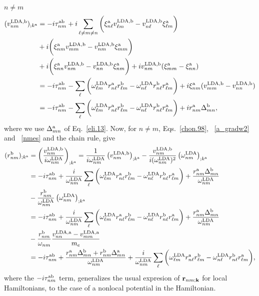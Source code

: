  $n\ne m$
\begin{align}\label{nmes}
(v^{\mathrm{LDA},\mathrm{b}}_{nm})_{;k^{\mathrm{a}}}&=
-i\tau^{\mathrm{a}\mathrm{b}}_{nm}
+i  
\sum_{\ell\ne m\ne n}
\bigg(
\xi^{\mathrm{a}}_{n\ell}  
v^{\mathrm{LDA},\mathrm{b}}_{\ell m}
-  
v^{\mathrm{LDA},\mathrm{b}}_{n\ell}
\xi^{\mathrm{a}}_{\ell m}
\bigg)  
\nonumber\\
&+  
i  
\bigg(
\xi^{\mathrm{a}}_{nm}  
v^{\mathrm{LDA},\mathrm{b}}_{mm}
-  
v^{\mathrm{LDA},\mathrm{b}}_{nm}
\xi^{\mathrm{a}}_{mm}
\bigg)  
\nonumber\\
&+  
i  
\bigg(
\xi^{\mathrm{a}}_{nn}  
v^{\mathrm{LDA},\mathrm{b}}_{nm}
-  
v^{\mathrm{LDA},\mathrm{b}}_{nn}
\xi^{\mathrm{a}}_{nm}
\bigg)  
+i   
v^{\mathrm{LDA},\mathrm{b}}_{nm}(\xi^{\mathrm{a}}_{mm}
-
\xi^{\mathrm{a}}_{nn}
)  
\nonumber \\
&=
-i\tau^{\mathrm{a}\mathrm{b}}_{nm}
-
\sum_{\ell}
\bigg(
\omega^{\mathrm{LDA}}_{\ell m}  
r^{\mathrm{a}}_{n\ell}  
r^{\mathrm{b}}_{\ell m}
-
\omega^{\mathrm{LDA}}_{n\ell}  
r^{\mathrm{b}}_{n\ell}  
r^{\mathrm{a}}_{\ell m}
\bigg)  
+i  
\xi^{\mathrm{a}}_{nm}
(v^{\mathrm{LDA},\mathrm{b}}_{mm}
-  
v^{\mathrm{LDA},\mathrm{b}}_{nn}
)  
\nonumber \\
&=
-i\tau^{\mathrm{a}\mathrm{b}}_{nm}
-
\sum_{\ell}
\bigg(
\omega^{\mathrm{LDA}}_{\ell m}   
r^{\mathrm{a}}_{n\ell}   
r^{\mathrm{b}}_{\ell m}
-
\omega^{\mathrm{LDA}}_{n\ell}   
r^{\mathrm{b}}_{n\ell}   
r^{\mathrm{a}}_{\ell m}
\bigg)  
+i   
r^{\mathrm{a}}_{nm}
\Delta^{\mathrm{b}}_{mn}
,
\end{align}   
where we use $\Delta^{\mathrm{a}}_{mn}$ of Eq.~\eqref{eli.13}.
Now, for $n \ne m$, Eqs.~\eqref{chon.98},
~\eqref{a_gradw2} and 
~\eqref{nmes} and the chain rule, give
\begin{align}\label{na_rgendevn}
(r^{\mathrm{b}}_{nm})_{;k^{\mathrm{a}}}
&=\left(\frac{v^{\mathrm{LDA},\mathrm{b}}_{nm}}{i\omega^{\mathrm{LDA}}_{nm}}\right)_{;k^{\mathrm{a}}}
=
\frac{1}
{i\omega^{\mathrm{LDA}}_{nm}}
\left( 
v^{\mathrm{LDA},\mathrm{b}}_{nm}
\right)_{;k^{\mathrm{a}}}
-
\frac{v^{\mathrm{LDA},\mathrm{b}}_{nm}}
{i(\omega^{\mathrm{LDA}}_{nm})^2}
\left(
\omega^{\mathrm{LDA}}_{nm}
\right)_{;k^{\mathrm{a}}}
\nonumber \\
&=
-i\tau^{\mathrm{a}\mathrm{b}}_{nm}
+
\frac{i}{\omega^{\mathrm{LDA}}_{nm}}
\sum_{\ell}
\bigg(
\omega^{\mathrm{LDA}}_{\ell m} 
r^{\mathrm{a}}_{n\ell} 
r^{\mathrm{b}}_{\ell m}
-
\omega^{\mathrm{LDA}}_{n\ell} 
r^{\mathrm{b}}_{n\ell} 
r^{\mathrm{a}}_{\ell m}
\bigg)
+
\frac{r^{\mathrm{a}}_{nm}
\Delta^{\mathrm{b}}_{mn}}
{\omega^{\mathrm{LDA}}_{nm}}
\nonumber \\
&
-
\frac{r^{\mathrm{b}}_{nm}}
{\omega^{\mathrm{LDA}}_{nm}}
\left(
\omega^{\mathrm{LDA}}_{nm}
\right)_{;k^{\mathrm{a}}}
\nonumber \\
&=
-i\tau^{\mathrm{a}\mathrm{b}}_{nm}
+
\frac{i}{\omega^{\mathrm{LDA}}_{nm}}
\sum_{\ell}
\bigg(
\omega^{\mathrm{LDA}}_{\ell m} 
r^{\mathrm{a}}_{n\ell} 
r^{\mathrm{b}}_{\ell m}
-
\omega^{\mathrm{LDA}}_{n\ell} 
r^{\mathrm{b}}_{n\ell} 
r^{\mathrm{a}}_{\ell m}
\bigg)
+
\frac{r^{\mathrm{a}}_{nm}
\Delta^{\mathrm{b}}_{mn}}
{\omega^{\mathrm{LDA}}_{nm}}
\nonumber \\
&
-
\frac{r^{\mathrm{b}}_{nm}}
{\omega_{nm}}
\frac{v^{\mathrm{LDA},\mathrm{a}}_{nn}-v^{\mathrm{LDA},\mathrm{a}}_{mm}}{m_e}
\nonumber \\
&=
-i\tau^{\mathrm{a}\mathrm{b}}_{nm}
+
\frac{ 
r^{\mathrm{a}}_{nm}
\Delta^{\mathrm{b}}_{mn}
+r^{\mathrm{b}}_{nm}
\Delta^{\mathrm{a}}_{mn}
}
{\omega^{\mathrm{LDA}}_{nm}}
+
\frac{i}{\omega^{\mathrm{LDA}}_{nm}}
\sum_{\ell}
\bigg(
\omega^{\mathrm{LDA}}_{\ell m} 
r^{\mathrm{a}}_{n\ell} 
r^{\mathrm{b}}_{\ell m}
-
\omega^{\mathrm{LDA}}_{n\ell} 
r^{\mathrm{b}}_{n\ell} 
r^{\mathrm{a}}_{\ell m}
\bigg)
,
\end{align} 
where the $-i\tau^{\mathrm{a}\mathrm{b}}_{nm}$ term, generalizes the usual expresion of
$\mathbf{r}_{nm;\mathbf{k}}$ for local 
Hamiltonians,\cite{aversaPRB95,nastosPRB05,cabellosPRB09,rashkeevPRB98}
to
the case of a
nonlocal potential in the Hamiltonian.


